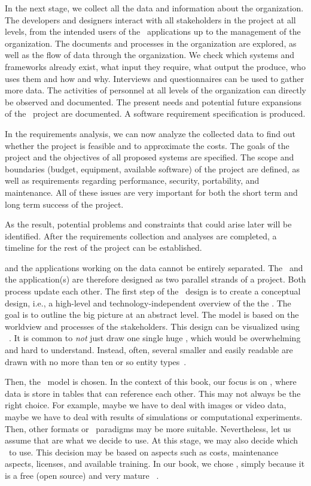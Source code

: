 In the next stage, we collect all the data and information about the organization.
The developers and designers interact with all stakeholders in the project at all levels, from the intended users of the \db\ applications up to the management of the organization.
The documents and processes in the organization are explored, as well as the flow of data through the organization.
We check which systems and frameworks already exist, what input they require, what output the produce, who uses them and how and why.
Interviews and questionnaires can be used to gather more data.
The activities of personnel at all levels of the organization can directly be observed and documented.
The present needs and potential future expansions of the \db\ project are documented.
A software requirement specification is produced.

In the requirements analysis, we can now analyze the collected data to find out whether the project is feasible and to approximate the costs.
The goals of the project and the objectives of all proposed systems are specified.
The scope and boundaries (budget, equipment, available software) of the project are defined, as well as requirements regarding performance, security, portability, and maintenance.
All of these issues are very important for both the short term and long term success of the project.

As the result, potential problems and constraints that could arise later will be identified.
After the requirements collection and analyses are completed, a timeline for the rest of the project can be established.

 and the applications working on the data cannot be entirely separated.
The \db\ and the application(s) are therefore designed as two parallel strands of a project.
Both process update each other.
The first step of the \db\ design is to create a conceptual design, i.e., a high-level and technology-independent overview of the the \db.
The goal is to outline the big picture at an abstract level.
The model is based on the worldview and processes of the stakeholders.
This design can be visualized using ~\cite{WF1995DHQDM,B1990CMERMO}.
It is common to \emph{not} just draw one single huge , which would be overwhelming and hard to understand.
Instead, often, several smaller and easily readable  are drawn with no more than ten or so entity types~\cite{WF1995DHQDM}.

Then, the \db\ model is chosen.
In the context of this book, our focus is on , where data is store in tables that can reference each other.
This may not always be the right choice.
For example, maybe we have to deal with images or video data, maybe we have to deal with results of simulations or computational experiments.
Then, other formats or \db\ paradigms may be more suitable.
Nevertheless, let us assume that  are what we decide to use.
At this stage, we may also decide which \dbms\ to use.
This decision may be based on aspects such as costs, maintenance aspects, licenses, and available training.
In our book, we chose \postgresql, simply because it is a free (open source) and very mature \sql\ \dbms.

